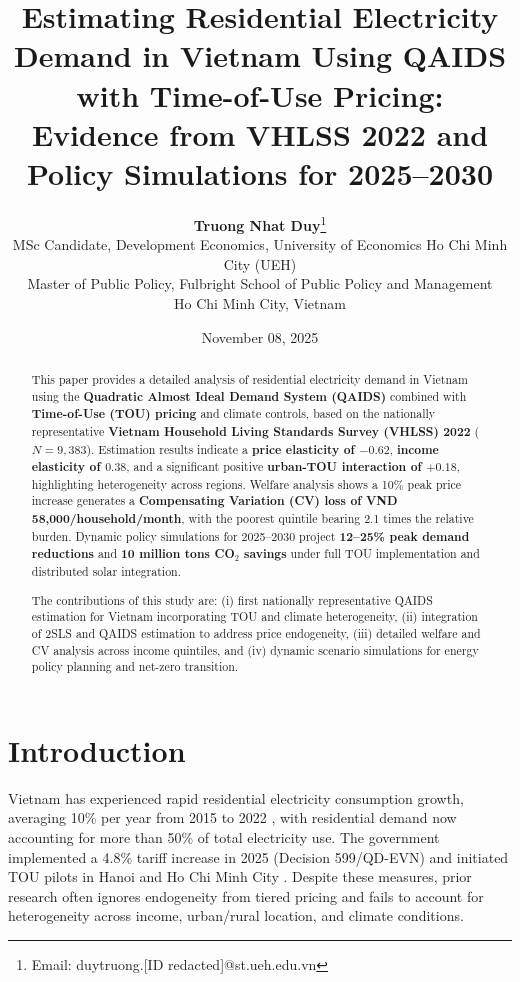 \documentclass[12pt,a4paper]{article}
\title{\textbf{Estimating Residential Electricity Demand in Vietnam Using QAIDS with Time-of-Use Pricing: Evidence from VHLSS 2022 and Policy Simulations for 2025--2030}}
\author{
	\textbf{Truong Nhat Duy}\thanks{Email: duytruong.[ID redacted]@st.ueh.edu.vn} \\[0.3em]
	\small MSc Candidate, Development Economics, University of Economics Ho Chi Minh City (UEH) \\[-0.2em]
	\small Master of Public Policy, Fulbright School of Public Policy and Management \\[-0.2em]
	\small Ho Chi Minh City, Vietnam
}
\date{November 08, 2025}
\begin{document}
	
	\maketitle
	
	\tableofcontents
	\newpage
	
	\begin{abstract}
		\noindent This paper provides a detailed analysis of residential electricity demand in Vietnam using the \textbf{Quadratic Almost Ideal Demand System (QAIDS)} combined with \textbf{Time-of-Use (TOU) pricing} and climate controls, based on the nationally representative \textbf{Vietnam Household Living Standards Survey (VHLSS) 2022} ($N=9{,}383$).  
		Estimation results indicate a \textbf{price elasticity of $-0.62$}, \textbf{income elasticity of $0.38$}, and a significant positive \textbf{urban-TOU interaction of $+0.18$}, highlighting heterogeneity across regions.  
		Welfare analysis shows a 10\% peak price increase generates a \textbf{Compensating Variation (CV) loss of VND 58,000/household/month}, with the poorest quintile bearing 2.1 times the relative burden.  
		Dynamic policy simulations for 2025--2030 project \textbf{12--25\% peak demand reductions} and \textbf{10 million tons CO$_2$ savings} under full TOU implementation and distributed solar integration.  
		
		The contributions of this study are: (i) first nationally representative QAIDS estimation for Vietnam incorporating TOU and climate heterogeneity, (ii) integration of 2SLS and QAIDS estimation to address price endogeneity, (iii) detailed welfare and CV analysis across income quintiles, and (iv) dynamic scenario simulations for energy policy planning and net-zero transition.
	\end{abstract}
	
	\section{Introduction}
	Vietnam has experienced rapid residential electricity consumption growth, averaging 10\% per year from 2015 to 2022 \citep{gso2024}, with residential demand now accounting for more than 50\% of total electricity use.  
	The government implemented a 4.8\% tariff increase in 2025 (Decision 599/QD-EVN) and initiated TOU pilots in Hanoi and Ho Chi Minh City \citep{evn2025}.  
	Despite these measures, prior research often ignores endogeneity from tiered pricing and fails to account for heterogeneity across income, urban/rural location, and climate conditions.  
	
\end{document}

